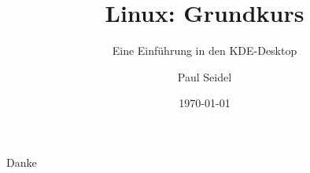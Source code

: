 \documentclass{beamer}
\title{Linux: Grundkurs}
\subtitle{Eine Einführung in den KDE-Desktop}
\author{Paul Seidel}
\date{\today} %
\institute{ZKK - Universität Passau}
\begin{document}
    \maketitle

    
    

    \begin{frame}[standout]
        Danke
    \end{frame}
\end{document}
